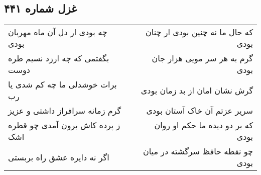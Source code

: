 \begin{center}
\section*{غزل شماره ۴۴۱}
\label{sec:sh441}
\begin{longtable}{l p{0.5cm} r}
چه بودی ار دل آن ماه مهربان بودی
&&
که حال ما نه چنین بودی ار چنان بودی
\\
بگفتمی که چه ارزد نسیم طره دوست
&&
گرم به هر سر مویی هزار جان بودی
\\
برات خوشدلی ما چه کم شدی یا رب
&&
گرش نشان امان از بد زمان بودی
\\
گرم زمانه سرافراز داشتی و عزیز
&&
سریر عزتم آن خاک آستان بودی
\\
ز پرده کاش برون آمدی چو قطره اشک
&&
که بر دو دیده ما حکم او روان بودی
\\
اگر نه دایره عشق راه بربستی
&&
چو نقطه حافظ سرگشته در میان بودی
\\
\end{longtable}
\end{center}
